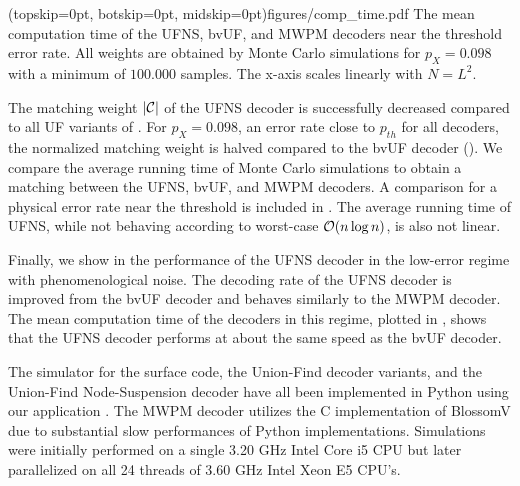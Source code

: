 \Figure[b!](topskip=0pt, botskip=0pt, midskip=0pt){figures/comp_time.pdf}{
  The mean computation time of the UFNS, bvUF, and MWPM decoders near the threshold error rate. All weights are obtained by Monte Carlo simulations for $p_X=0.098$ with a minimum of $100.000$ samples. The x-axis scales linearly with $N = L^2$.\label{comp_time}}

The matching weight $\lvert\mathcal{C}\rvert$ of the UFNS decoder is successfully decreased compared to all UF variants of . For $p_X = 0.098$, an error rate close to $p_{th}$ for all decoders, the normalized matching weight is halved compared to the bvUF decoder (). We compare the average running time of Monte Carlo simulations to obtain a matching between the UFNS, bvUF, and MWPM decoders. A comparison for a physical error rate near the threshold is included in . The average running time of UFNS, while not behaving according to worst-case $\mathcal{O}(n \log{n})$, is also not linear. 

Finally, we show in  the performance of the UFNS decoder in the low-error regime with phenomenological noise. The decoding rate of the UFNS decoder is improved from the bvUF decoder and behaves similarly to the MWPM decoder. The mean computation time of the decoders in this regime, plotted in , shows that the UFNS decoder performs at about the same speed as the bvUF decoder.\par

The simulator for the surface code, the Union-Find decoder variants, and the Union-Find Node-Suspension decoder have all been implemented in Python using our application \cite{OpenSurfaceSim}. The MWPM decoder utilizes the C implementation of BlossomV \cite{kolmogorov2009blossom} due to substantial slow performances of Python implementations. Simulations were initially performed on a single 3.20 GHz Intel Core i5 CPU but later parallelized on all 24 threads of 3.60 GHz Intel Xeon E5 CPU's. 